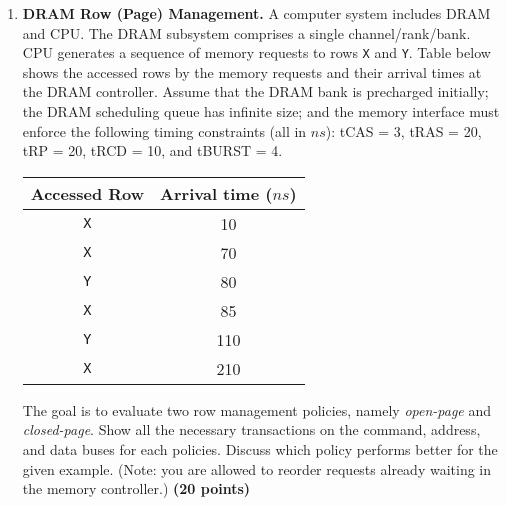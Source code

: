 \documentclass[a4paper, 11pt]{exam}
\begin{document}
\begin{enumerate}

\item \textbf{DRAM Row (Page) Management.}
A computer system includes DRAM and CPU.
The DRAM subsystem comprises a single channel/rank/bank.
CPU generates a sequence of memory requests to rows \texttt{X} and \texttt{Y}.
Table below shows the accessed rows by the memory requests and their arrival times at the DRAM controller.
Assume that the DRAM bank is precharged initially; the DRAM scheduling queue has infinite size; and the memory interface must enforce the following timing constraints (all in $ns$):
tCAS = 3, tRAS = 20, tRP = 20, tRCD = 10, and tBURST = 4. 

\begin{center}
	\begin{tabular}{|c|c|}
		\hline
		\textbf{Accessed Row} & \textbf{Arrival time ($ns$)} \\
		\hline
		\texttt{X}  & 10 \\
		\hline
		\texttt{X}  & 70 \\
		\hline
		\texttt{Y}  & 80 \\
		\hline
		\texttt{X}  & 85 \\
		\hline
		\texttt{Y}  & 110 \\
		\hline
		\texttt{X} & 210 \\
		\hline
	\end{tabular}
\end{center}

The goal is to evaluate two row management policies, namely \textit{open-page} and \textit{closed-page}.
Show all the necessary transactions on the command, address, and data buses for each policies.
Discuss which policy performs better for the given example.
(Note: you are allowed to reorder requests already waiting in the memory controller.)
\textbf{(20 points)}
\begin{figure}[h!]
	\begin{center}
	\end{center}
\end{figure}



\end{enumerate}
\end{document}
